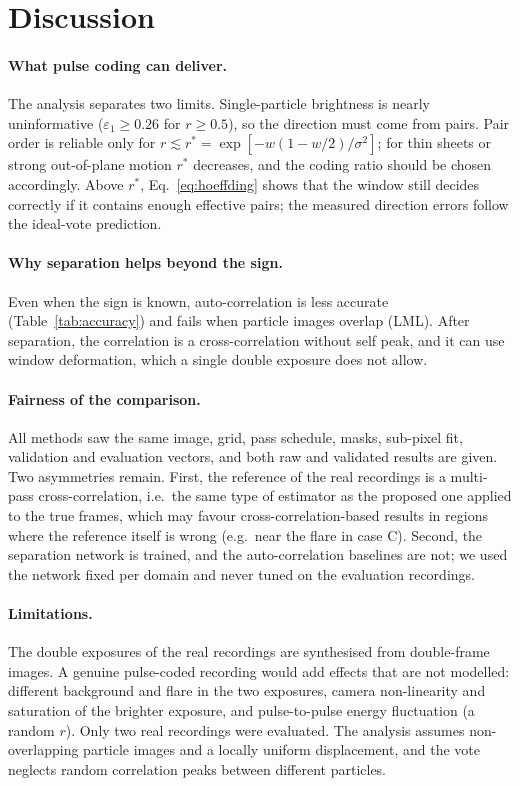 \documentclass[11pt]{article}
\theoremstyle{remark}
\begin{document}
\FloatBarrier
\section{Discussion}

\paragraph{What pulse coding can deliver.}
The analysis separates two limits. Single-particle brightness is nearly uninformative ($\varepsilon_1\ge0.26$ for $r\ge0.5$), so the direction must come from pairs. Pair order is reliable only for $r\lesssim r^\ast=\exp[-w(1-w/2)/\sigma^2]$; for thin sheets or strong out-of-plane motion $r^\ast$ decreases, and the coding ratio should be chosen accordingly. Above $r^\ast$, Eq.~\eqref{eq:hoeffding} shows that the window still decides correctly if it contains enough effective pairs; the measured direction errors follow the ideal-vote prediction.

\paragraph{Why separation helps beyond the sign.}
Even when the sign is known, auto-correlation is less accurate (Table~\ref{tab:accuracy}) and fails when particle images overlap (LML). After separation, the correlation is a cross-correlation without self peak, and it can use window deformation, which a single double exposure does not allow.

\paragraph{Fairness of the comparison.}
All methods saw the same image, grid, pass schedule, masks, sub-pixel fit, validation and evaluation vectors, and both raw and validated results are given. Two asymmetries remain. First, the reference of the real recordings is a multi-pass cross-correlation, i.e.\ the same type of estimator as the proposed one applied to the true frames, which may favour cross-correlation-based results in regions where the reference itself is wrong (e.g.\ near the flare in case C). Second, the separation network is trained, and the auto-correlation baselines are not; we used the network fixed per domain and never tuned on the evaluation recordings.

\paragraph{Limitations.}
The double exposures of the real recordings are synthesised from double-frame images. A genuine pulse-coded recording would add effects that are not modelled: different background and flare in the two exposures, camera non-linearity and saturation of the brighter exposure, and pulse-to-pulse energy fluctuation (a random $r$). Only two real recordings were evaluated. The analysis assumes non-overlapping particle images and a locally uniform displacement, and the vote neglects random correlation peaks between different particles.
\end{document}
